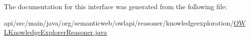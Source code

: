 The documentation for this interface was generated from the following file\-:\begin{DoxyCompactItemize}
\item 
api/src/main/java/org/semanticweb/owlapi/reasoner/knowledgeexploration/\hyperlink{_o_w_l_knowledge_explorer_reasoner_8java}{O\-W\-L\-Knowledge\-Explorer\-Reasoner.\-java}\end{DoxyCompactItemize}
